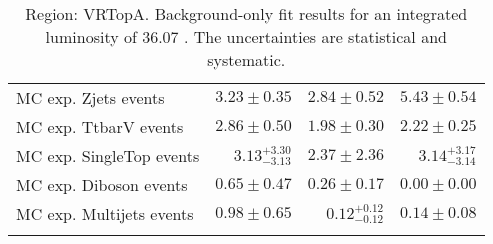 \begin{table}
\begin{center}
{\begin{tabular*}{\textwidth}{@{\extracolsep{\fill}}lrrr}
        MC exp. Zjets events         & $3.23 \pm 0.35$          & $2.84 \pm 0.52$          & $5.43 \pm 0.54$              \\
        MC exp. TtbarV events         & $2.86 \pm 0.50$          & $1.98 \pm 0.30$          & $2.22 \pm 0.25$              \\
        MC exp. SingleTop events         & $3.13_{-3.13}^{+3.30}$          & $2.37 \pm 2.36$          & $3.14_{-3.14}^{+3.17}$              \\
        MC exp. Diboson events         & $0.65 \pm 0.47$          & $0.26 \pm 0.17$          & $0.00 \pm 0.00$              \\
        MC exp. Multijets events         & $0.98 \pm 0.65$          & $0.12_{-0.12}^{+0.12}$          & $0.14 \pm 0.08$              \\
\noalign{\smallskip}\hline\noalign{\smallskip}
\end{tabular*}
}
\end{center}
\caption{Region: VRTopA. Background-only fit results for an integrated luminosity of 36.07 \ifb. The uncertainties are statistical and systematic.
}
\label{table.bkgonly.VRTopA}
\end{table}
%